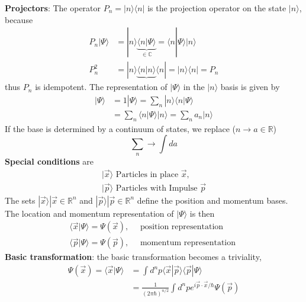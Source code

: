 \textbf{Projectors}: The operator $P_n=| n\rangle\langle n|$ is the projection operator on the state $| n\rangle$, because
\begin{equation}
\begin{aligned} P_{n}|\Psi\rangle &=|n\rangle \underbrace{\langle n | \Psi\rangle}_{\in \mathbb{C}}=\langle n | \Psi\rangle|n\rangle \\ P_{n}^{2} &=|n\rangle\underbrace{\langle n | n\rangle}\langle n|=| n\rangle\langle n|=P_{n} \end{aligned}
\end{equation}
thus $P_n$ is idempotent.
The representation of $|\Psi\rangle$ in the $| n\rangle$ basis is given by
\begin{equation}
\begin{aligned}|\Psi\rangle &= 1|\Psi\rangle=\sum_{n}|n\rangle\langle n | \Psi\rangle \\ &=\sum_{n}\langle n | \Psi\rangle|n\rangle=\sum_{n} a_{n}|n\rangle \end{aligned}
\end{equation}
If the base is determined by a continuum of states, we replace ($n\to a\in\mathbb{R}$)
\begin{equation}
    \sum_n\to \int da
\end{equation}
\textbf{Special conditions} are
\begin{equation}
    \begin{array}{l}{|\vec{x}\rangle \text{  Particles in place }\vec{x},}\\{|\vec{p}\rangle \text{  Particles with Impulse }\vec{p}}  
    \end{array}
\end{equation}
The sets {$|\vec{x}\rangle|\vec{x}\in\mathbb{R}^n$} and {$|\vec{p}\rangle|\vec{p}\in\mathbb{R}^n$} define the position and momentum bases. The location and momentum representation of $|\Psi\rangle$ is then
\begin{equation}
\begin{array}{l}{\langle\vec{x} | \Psi\rangle=\Psi(\vec{x}), \quad \text { position representation }} \\ {\langle\vec{p} | \Psi\rangle=\Psi(\vec{p}), \quad \text { momentum representation }}\end{array}
\end{equation}
\textbf{Basic transformation}: the basic transformation becomes a triviality,
\begin{equation}
\begin{aligned} \Psi(\vec{x})=\langle\vec{x} | \Psi\rangle &=\int d^{n} p\langle\vec{x} | \vec{p}\rangle\langle\vec{p} | \Psi\rangle \\ &=\frac{1}{(2 \pi \hbar)^{n / 2}} \int d^{n} p e^{i \vec{p} \cdot \vec{x} / \hbar} \Psi(\vec{p}) \end{aligned}
\end{equation}
